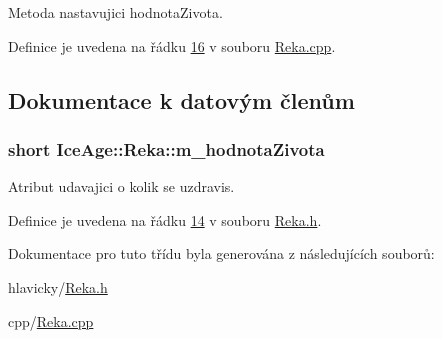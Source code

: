 Metoda nastavujici hodnota\+Zivota. 

Definice je uvedena na řádku \hyperlink{Reka_8cpp_source_l00016}{16} v souboru \hyperlink{Reka_8cpp_source}{Reka.\+cpp}.



\subsection{Dokumentace k datovým členům}
\subsubsection[{\texorpdfstring{m\+\_\+hodnota\+Zivota}{m_hodnotaZivota}}]{\setlength{\rightskip}{0pt plus 5cm}short Ice\+Age\+::\+Reka\+::m\+\_\+hodnota\+Zivota\hspace{0.3cm}{\ttfamily [private]}}\hypertarget{classIceAge_1_1Reka_acc162b1ee9e0678f92750a7e972460fa}{}\label{classIceAge_1_1Reka_acc162b1ee9e0678f92750a7e972460fa}


Atribut udavajici o kolik se uzdravis. 



Definice je uvedena na řádku \hyperlink{Reka_8h_source_l00014}{14} v souboru \hyperlink{Reka_8h_source}{Reka.\+h}.



Dokumentace pro tuto třídu byla generována z následujících souborů\+:\begin{DoxyCompactItemize}
\item 
hlavicky/\hyperlink{Reka_8h}{Reka.\+h}\item 
cpp/\hyperlink{Reka_8cpp}{Reka.\+cpp}\end{DoxyCompactItemize}
